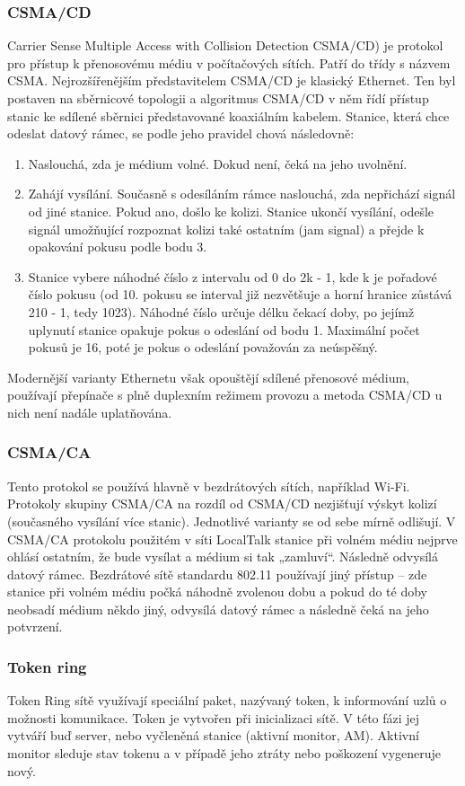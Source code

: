 \subsubsection{CSMA/CD}
Carrier Sense Multiple Access with Collision Detection CSMA/CD) je protokol pro přístup k přenosovému médiu v počítačových sítích. Patří do třídy s názvem CSMA. Nejrozšířenějším představitelem CSMA/CD je klasický Ethernet. Ten byl postaven na sběrnicové topologii a algoritmus CSMA/CD v něm řídí přístup stanic ke sdílené sběrnici představované koaxiálním kabelem. Stanice, která chce odeslat datový rámec, se podle jeho pravidel chová následovně: 
\begin{enumerate}
    \item Naslouchá, zda je médium volné. Dokud není, čeká na jeho uvolnění.
    \item Zahájí vysílání. Současně s odesíláním rámce naslouchá, zda nepřichází signál od jiné stanice. Pokud ano, došlo ke kolizi. Stanice ukončí vysílání, odešle signál umožňující rozpoznat kolizi také ostatním (jam signal) a přejde k opakování pokusu podle bodu 3.
    \item Stanice vybere náhodné číslo z intervalu od 0 do 2k - 1, kde k je pořadové číslo pokusu (od 10. pokusu se interval již nezvětšuje a horní hranice zůstává 210 - 1, tedy 1023). Náhodné číslo určuje délku čekací doby, po jejímž uplynutí stanice opakuje pokus o odeslání od bodu 1. Maximální počet pokusů je 16, poté je pokus o odeslání považován za neúspěšný.
\end{enumerate}
Modernější varianty Ethernetu však opouštějí sdílené přenosové médium, používají přepínače s plně duplexním režimem provozu a metoda CSMA/CD u nich není nadále uplatňována. 
\subsubsection{CSMA/CA}
Tento protokol se používá hlavně v bezdrátových sítích, například Wi-Fi. Protokoly skupiny CSMA/CA na rozdíl od CSMA/CD nezjišťují výskyt kolizí (současného vysílání více stanic). Jednotlivé varianty se od sebe mírně odlišují. V CSMA/CA protokolu použitém v síti LocalTalk stanice při volném médiu nejprve ohlásí ostatním, že bude vysílat a médium si tak „zamluví“. Následně odvysílá datový rámec. Bezdrátové sítě standardu 802.11 používají jiný přístup – zde stanice při volném médiu počká náhodně zvolenou dobu a pokud do té doby neobsadí médium někdo jiný, odvysílá datový rámec a následně čeká na jeho potvrzení.
\subsubsection{Token ring}
Token Ring sítě využívají speciální paket, nazývaný token, k informování uzlů o možnosti komunikace. Token je vytvořen při inicializaci sítě. V této fázi jej vytváří buď server, nebo vyčleněná stanice (aktivní monitor, AM). Aktivní monitor sleduje stav tokenu a v případě jeho ztráty nebo poškození vygeneruje nový.

